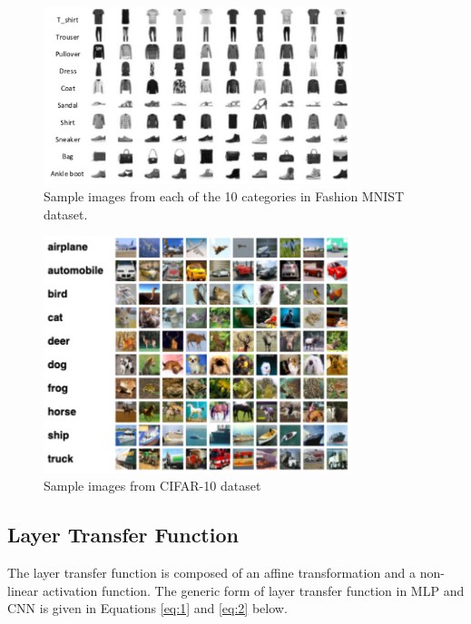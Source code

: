 \documentclass[wcp]{jmlr}
\begin{document}
\begin{figure}[htp]
\begin{center}
\includegraphics[width=0.8\textwidth]{images/fashionmnist.png}
\caption{Sample images from each of the 10 categories in Fashion MNIST dataset.}\label{fig:fashionmnist}
\end{center}
\end{figure}

\begin{figure}[htp]
\begin{center}
\includegraphics[width=0.8\textwidth]{images/Cifar10.png}
\caption{Sample images from CIFAR-10 dataset}\label{fig:cifar10}
\end{center}
\end{figure}

\subsection{Layer Transfer Function}
The layer transfer function is composed of an affine transformation and a non-linear activation function. The generic form of layer transfer function in MLP and CNN is given in Equations \ref{eq:1} and \ref{eq:2} below.
\end{document}
